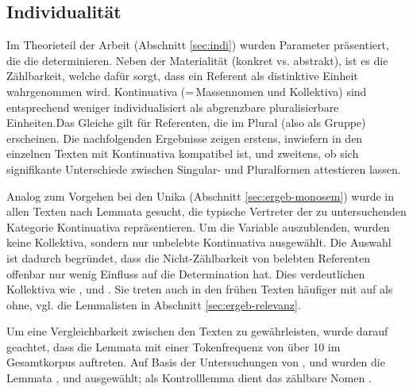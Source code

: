 \subsection{Individualität}\label{sec:ergeb-individualität}

Im Theorieteil der Arbeit (Abschnitt \ref{sec:indi}) wurden Parameter präsentiert, die die   determinieren. Neben der Materialität (konkret vs. abstrakt), ist es die Zählbarkeit, welche dafür sorgt, dass ein Referent als distinktive Einheit wahrgenommen wird. Kontinuativa  (=\,Massennomen und Kollektiva) sind entsprechend weniger individualisiert als abgrenzbare pluralisierbare Einheiten.\linebreak Das Gleiche gilt für Referenten, die im Plural (also als Gruppe) erscheinen. Die nachfolgenden Ergebnisse zeigen erstens, inwiefern  in den einzelnen Texten mit Kontinuativa kompatibel ist, und zweitens, ob sich signifikante Unterschiede zwischen Singular- und Pluralformen attestieren lassen.


Analog zum Vorgehen bei den Unika  (Abschnitt \ref{sec:ergeb-monosem}) wurde in allen Texten nach Lemmata  gesucht, die typische Vertreter der zu untersuchenden Kategorie Kontinuativa repräsentieren. Um die Variable  auszublenden, wurden keine Kollektiva, sondern nur unbelebte Kontinuativa  ausgewählt. Die Auswahl ist dadurch begründet, dass die Nicht-Zählbarkeit von belebten Referenten offenbar nur wenig Einfluss auf die Determination hat. Dies verdeutlichen Kollektiva  wie ,  und  . Sie treten auch in den frühen Texten häufiger mit  auf als ohne, vgl. die Lemmalisten  in Abschnitt \ref{sec:ergeb-relevanz}. 

Um eine Vergleichbarkeit zwischen den Texten zu gewährleisten, wurde darauf geachtet, dass die Lemmata  mit einer Tokenfrequenz  von über 10 im Gesamtkorpus  auftreten. Auf Basis der Untersuchungen von \textcite[28--29]{Graf1905}, \textcite[27--28]{Bell1907} und  \textcite[464ff]{Oubouzar1989} wurden die Lemmata   ,   und    ausgewählt; als Kontrolllemma  dient das zählbare Nomen  . 

